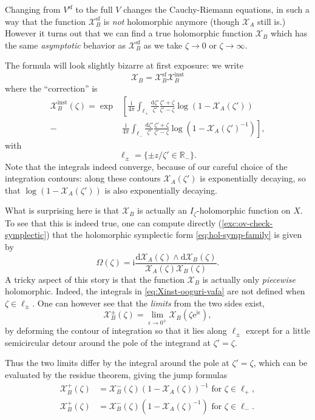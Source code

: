 \documentclass[12pt,letterpaper,reqno]{article}
\numberwithin{equation}{section}
\newcommand{\cX}{\ensuremath{\mathcal X}}
\newcommand{\R}{\ensuremath{\mathbb R}}
\newcommand{\I}{{\mathrm i}}
\newcommand{\e}{{\mathrm e}}
\newcommand{\de}{\mathrm{d}}
\renewcommand{\sf}{\mathrm{sf}}
\newcommand{\inst}{\mathrm{inst}}
\newcommand{\eps}{\epsilon}
\newcommand{\ti}[1]{\textit{#1}}
\newcommand{\insfig}[2]{

\medskip
\noindent
\begin{minipage}{\linewidth}

\makebox[\linewidth]{\texttt{[image: figures/\#1-crop.pdf]}}

\end{minipage}
\medskip

}
\begin{document}
\begin{example}
Changing from $V^\sf$ to the full $V$
changes the Cauchy-Riemann equations, in such a way
that the function $\cX_B^\sf$ is \ti{not} holomorphic anymore
(though $\cX_A$ still is.)
However it turns out that we can
find a true holomorphic function $\cX_B$ which has the same \ti{asymptotic}
behavior as $\cX_B^\sf$ as we take $\zeta \to 0$ or $\zeta\to\infty$.

The formula will look slightly bizarre at first exposure:
we write
\begin{equation}
  \cX_B = \cX_B^{\sf} \cX_B^{\inst}
\end{equation}
where the ``correction'' is
\begin{align} \label{eq:Xinst-ooguri-vafa}
  \cX_B^\inst(\zeta) = \exp & \left[ \frac{\I}{4 \pi} \int_{\ell_+} \frac{\de \zeta'}{\zeta'} \frac{\zeta' + \zeta}{\zeta' - \zeta} \log(1 - \cX_A(\zeta')) \right. \\
  - & \left. \frac{\I}{4 \pi} \int_{\ell_-} \frac{\de \zeta'}{\zeta'} \frac{\zeta' + \zeta}{\zeta' - \zeta} \log(1 - \cX_A(\zeta')^{-1}) \right],
\end{align}
with
\begin{equation}
  \ell_\pm = \{ \pm z/\zeta' \in \R_- \}.
\end{equation}
Note that the integrals indeed converge, because of our careful choice
of the integration contours: along these contours $\cX_A(\zeta')$ is
exponentially decaying, so that $\log(1 - \cX_A(\zeta'))$ is also
exponentially decaying.

What is surprising here is that $\cX_B$
is actually an $I_\zeta$-holomorphic function on $X$.
To see that this is indeed true,
one can compute directly (\autoref{exc:ov-check-symplectic})
that the holomorphic symplectic form \eqref{eq:hol-symp-family}
is given by
\begin{equation} \label{eq:hol-symp-ooguri-vafa}
  \Omega(\zeta) = \I \frac{\de \cX_A(\zeta) \wedge \de \cX_B(\zeta)}{\cX_A(\zeta) \cX_B(\zeta)}.
\end{equation}
A tricky aspect of this story is that the function $\cX_B$ is
actually only \ti{piecewise} holomorphic. Indeed, the integrals
in \eqref{eq:Xinst-ooguri-vafa} are not defined when $\zeta \in \ell_\pm$.
One can however see that the \ti{limits} from the two sides exist,
\begin{equation}
  \cX_B^\pm(\zeta) = \lim_{\eps \to 0^\pm} \cX_B(\zeta \e^{\I \eps}),
\end{equation}
by deforming the contour of integration so that it lies along
$\ell_\pm$ except for a little semicircular detour around the
pole of the integrand at $\zeta' = \zeta$.
\insfig{higgs-bundles-9}{0.8}
Thus the two limits differ by the integral around the pole
at $\zeta' = \zeta$, which can be evaluated by the residue theorem,
giving the jump formulas
\begin{align}
  \cX_B^+(\zeta) &= \cX_B^-(\zeta)(1 - \cX_A(\zeta))^{-1} \text{ for } \zeta \in \ell_+, \label{eq:ooguri-vafa-cluster-1} \\
  \cX_B^+(\zeta) &= \cX_B^-(\zeta)(1 - \cX_A(\zeta)^{-1}) \text{ for } \zeta \in \ell_-. \label{eq:ooguri-vafa-cluster-2}
\end{align}


\end{example}
\end{document}
